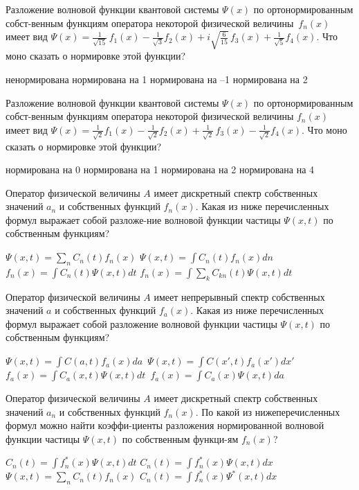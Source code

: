 \documentclass[11pt,a4paper]{exam}
\begin{document}
\begin{questions}
\question Разложение волновой функции квантовой системы $\Psi (x)$ по ортонормированным собст-венным функциям оператора некоторой физической величины $\,{f_n}(x)$ имеет вид $\Psi (x) = \frac{1}{{\sqrt {15} }}\,{f_1}(x) - \frac{1}{{\sqrt 3 }}{f_2}(x) + i\sqrt {\frac{6}{{15}}} \,{f_3}(x) + \frac{1}{{\sqrt 5 }}{f_4}(x)$. Что моно сказать о нормировке этой функции?
\begin{choices}
\choice ненормирована         
\choice нормирована на 1
\choice нормирована на –1     
\choice нормирована на 2
\end{choices}

\question Разложение волновой функции квантовой системы $\Psi (x)$ по ортонормированным собст-венным функциям оператора некоторой физической величины ${f_n}(x)$ имеет вид $\Psi (x) = \frac{1}{{\sqrt 2 }}{f_1}(x) - \frac{1}{{\sqrt 2 }}{f_2}(x) + \frac{1}{{\sqrt 2 }}\,{f_3}(x) - \frac{1}{{\sqrt 2 }}{f_4}(x)$. Что моно сказать о нормировке этой функции?
\begin{choices}
\choice нормирована на 0         
\choice нормирована на 1
\choice нормирована на 2         
\choice нормирована на 4
\end{choices}

\question Оператор физической величины $A$ имеет дискретный спектр собственных значений ${a_n}$ и собственных функций ${f_n}(x)$. Какая из ниже перечисленных формул выражает собой разложе-ние волновой функции частицы $\Psi (x,t)$ по собственным функциям?
\begin{choices}
\choice $\Psi (x,t) = \sum\limits_n {{C_n}(t){f_n}(x)} $       
\choice $\Psi (x,t) = \int {{C_n}(t){f_n}(x)} dn$
\choice ${f_n}(x) = \int {{C_n}(t)\Psi (x,t)dt} $        
\choice ${f_n}(x) = \int {\sum\limits_k {{C_{kn}}(t)\Psi (x,t)} } dt$
\end{choices}

\question Оператор физической величины $A$ имеет непрерывный спектр собственных значений $a$ и собственных функций ${f_a}(x)$. Какая из ниже перечисленных формул выражает собой разложение волновой функции частицы $\Psi (x,t)$ по собственным функциям?
\begin{choices}
\choice $\Psi (x,t) = \int {C(a,t){f_a}(x)da} \,$     
\choice $\Psi (x,t) = \int {C(x',t){f_a}(x')} dx'$
\choice ${f_a}(x) = \int {{C_a}(x,t)\Psi (x,t)dt} \,$ 
\choice ${f_a}(x) = \int {{C_a}(x)\Psi (x,t)da} $
\end{choices}

\question Оператор физической величины $A$ имеет дискретный спектр собственных значений ${a_n}$ и собственных функций ${f_n}(x)$. По какой из нижеперечисленных формул можно найти коэффи-циенты разложения нормированной волновой функции частицы $\Psi (x,t)$ по собственным функци-ям ${f_n}(x)$?
\begin{choices}
\choice ${C_n}(t) = \int {f_n^*(x)\Psi (x,t)dt} $        
\choice ${C_n}(t) = \int {f_n^*(x)\Psi (x,t)dx} $
\choice $\Psi (x,t) = \sum\limits_n {{C_n}(t){f_n}(x)} $       
\choice ${C_n}(t) = \int {f_n^*(x){\Psi ^*}(x,t)dx} $
\end{choices}


\end{questions}
\end{document}
